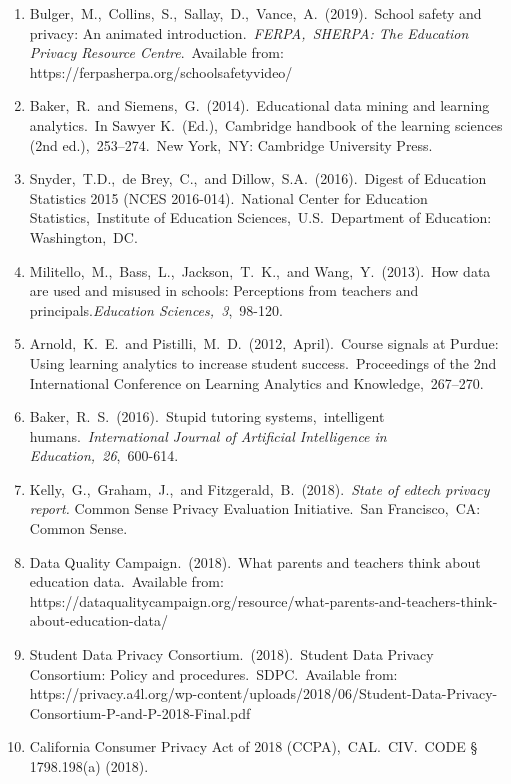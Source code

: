 \documentclass{article}
\begin{document}
\begin{enumerate}
    \label{sec:33}
    \item Bulger,\ M.,\ Collins,\ S.,\ Sallay,\ D.,\ Vance,\ A.\ (2019).\ School safety and privacy: An animated introduction.\ \textit{FERPA,\ SHERPA: The Education Privacy Resource Centre}.\ Available from: https://ferpasherpa.org/schoolsafetyvideo/
    \label{34}
    \item Baker,\ R.\ and Siemens,\ G.\ (2014).\ Educational data mining and learning analytics.\ In Sawyer K.\ (Ed.),\ Cambridge handbook of the learning sciences (2nd ed.),\ 253–274.\ New York,\ NY: Cambridge University Press.
    \label{35}
    \item Snyder,\ T.D.,\ de Brey,\ C.,\ and Dillow,\ S.A.\ (2016).\ Digest of Education Statistics 2015 (NCES 2016-014).\ National Center for Education Statistics,\ Institute of Education Sciences,\ U.S.\ Department of Education: Washington,\ DC.
    \label{36}
    \item Militello,\ M.,\ Bass,\ L.,\ Jackson,\ T.\ K.,\ and Wang,\ Y.\ (2013).\ How data are used and misused in schools: Perceptions from teachers and principals.\textit{Education Sciences,\ 3},\ 98-120.
    \label{37}
    \item Arnold,\ K.\ E.\ and Pistilli,\ M.\ D.\ (2012,\ April).\ Course signals at Purdue: Using learning analytics to increase student success.\ Proceedings of the 2nd International Conference on Learning Analytics and Knowledge,\ 267–270.
    \label{38}
    \item Baker,\ R.\ S.\ (2016).\ Stupid tutoring systems,\ intelligent humans.\ \textit{International Journal of Artificial Intelligence in Education,\ 26},\ 600-614.
    \label{39}
    \item Kelly,\ G.,\ Graham,\ J.,\ and Fitzgerald,\ B.\ (2018).\ \textit{State of edtech privacy report.} Common Sense Privacy Evaluation Initiative.\ San Francisco,\ CA: Common Sense.\ 
    \label{40}
    \item Data Quality Campaign.\ (2018).\ What parents and teachers think about education data.\ Available from: https://dataqualitycampaign.org/resource/what-parents-and-teachers-think-about-education-data/
    \label{41}
    \item Student Data Privacy Consortium.\ (2018).\ Student Data Privacy Consortium: Policy and procedures.\ SDPC.\ Available from: https://privacy.a4l.org/wp-content/uploads/2018/06/Student-Data-Privacy-Consortium-P-and-P-2018-Final.pdf 
    \label{42}
    \item California Consumer Privacy Act of 2018 (CCPA),\ CAL.\ CIV.\ CODE § 1798.198(a) (2018).

\end{enumerate}
\end{document}
